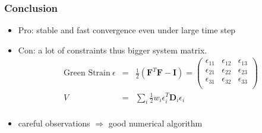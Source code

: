 \documentclass[serif,mathserif]{beamer}
\newcommand{\BOLD}[1]{\mathbf{#1}}
\begin{document}
\begin{frame}
 \frametitle{Conclusion}
 \begin{itemize}
  \item Pro: stable and fast convergence even under large time step
  \item Con: a lot of constraints thus bigger system matrix.
  \begin{eqnarray*}
    \text{Green Strain} ~\epsilon&=&\frac{1}{2}(\BOLD{F}^T\BOLD{F}-\BOLD{I})=
    \begin{pmatrix}
     \epsilon_{11} & \epsilon_{12} & \epsilon_{13} \\
     \epsilon_{21} & \epsilon_{22} & \epsilon_{23} \\
     \epsilon_{31} & \epsilon_{32} & \epsilon_{33} \\
    \end{pmatrix} \\
   V &=& \sum_i \frac{1}{2}w_i\epsilon_i^T\BOLD{D}_i\epsilon_i \\
  \end{eqnarray*}
  \item careful observations $\Rightarrow$ good numerical algorithm
 \end{itemize}
\end{frame}

\begin{frame} 
\end{frame}
\end{document}

